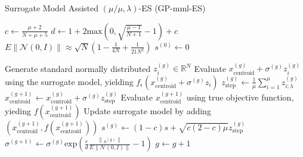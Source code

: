 \begin{algorithm}
\caption{Surrogate Model Assisted $(\mu/\mu,\lambda)$-ES (GP-mml-ES)}
\label{alg:GP-mml-es}
\begin{algorithmic}[1]
\STATE $c \leftarrow  \frac{\mu +2}{N+\mu+5}$ 
\STATE $d \leftarrow 1 + 2 \text{max}(0, \sqrt{\frac{\mu - 1}{N+1} } - 1 ) + c$
\STATE $E \left\lVert  \mathcal{N}(0,I) \right\rVert \approx \sqrt{N}(1 - \frac{1}{4N} + \frac{1}{21N^2})$
\STATE $s^{(0)} \leftarrow 0$

		\STATE Generate standard normally distributed $z_i^{(g)} \in \mathbb{R}^N $
		\STATE Evaluate $x_{\text{centroid}}^{(g)} + \sigma^{(g)} z_i^{(g)}$ using the surrogate model, yielding $f_{\epsilon}(x_{\text{centroid}}^{(g)} + \sigma^{(g)} z_i)$
	\ENDFOR
	\STATE $z_{\text{step}}^{(g)} \leftarrow \frac{1}{\mu}\sum_{i=1}^{\mu} z_{i;\lambda}^{(g)}$
	\STATE $x_{\text{centroid}}^{(g+1)} \leftarrow  x_{\text{centroid}}^{(g)} + \sigma^{(g)} z_{\text{step}}^{(g)}$ 
	\STATE Evaluate $x_{\text{centroid}}^{(g+1)}$ using true objective function, yieding $f(x_{\text{centroid}}^{(g+1)})$
	\STATE Update surrogate model by adding $(x_{\text{centroid}}^{(g+1)},f(x_{\text{centroid}}^{(g+1)}))$
	\STATE $s^{(g)} \leftarrow (1-c)s + \sqrt{ c(2-c) \mu} z_{\text{step}}^{(g)}$
	\STATE $\sigma^{(g+1)} \leftarrow \sigma^{(g)}  \text{exp} \left(\frac{c}{d} \frac{\left\lVert s^{(g)} \right\rVert} { E \left\lVert \mathcal{N}(0,I) \right\rVert} -1 \right )$
	\STATE $g \leftarrow g + 1$
\ENDWHILE

\end{algorithmic}
\end{algorithm}


